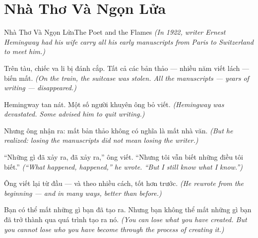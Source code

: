 \section{Nhà Thơ Và Ngọn Lửa}
\begin{truyen}{Nhà Thơ Và Ngọn Lửa}{The Poet and the Flames}
\textit{(In 1922, writer Ernest Hemingway had his wife carry all his early manuscripts from Paris to Switzerland to meet him.)}

Trên tàu, chiếc va li bị đánh cắp. Tất cả các bản thảo — nhiều năm viết lách — biến mất.
\textit{(On the train, the suitcase was stolen. All the manuscripts — years of writing — disappeared.)}

Hemingway tan nát. Một số người khuyên ông bỏ viết.
\textit{(Hemingway was devastated. Some advised him to quit writing.)}

Nhưng ông nhận ra: mất bản thảo không có nghĩa là mất nhà văn.
\textit{(But he realized: losing the manuscripts did not mean losing the writer.)}

``Những gì đã xảy ra, đã xảy ra,'' ông viết. ``Nhưng tôi vẫn biết những điều tôi biết.''
\textit{(``What happened, happened,'' he wrote. ``But I still know what I know.'')}

Ông viết lại từ đầu — và theo nhiều cách, tốt hơn trước.
\textit{(He rewrote from the beginning — and in many ways, better than before.)}

\end{truyen}

\begin{baihoc}
Bạn có thể mất những gì bạn đã tạo ra. Nhưng bạn không thể mất những gì bạn đã trở thành qua quá trình tạo ra nó.
\textit{(You can lose what you have created. But you cannot lose who you have become through the process of creating it.)}
\end{baihoc}
\ngancach

